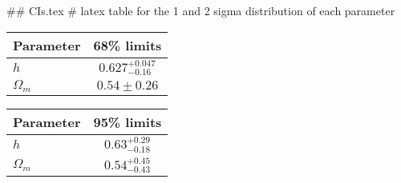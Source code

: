 ## CIs.tex
# latex table for the 1 and 2 sigma distribution of each parameter

\begin{tabular} { l  c}
 Parameter &  68\% limits\\
\hline
{\boldmath$h              $} & $0.627^{+0.047}_{-0.16}    $\\
{\boldmath$\Omega_m       $} & $0.54\pm 0.26              $\\
\hline
\end{tabular}

\begin{tabular} { l  c}
 Parameter &  95\% limits\\
\hline
{\boldmath$h              $} & $0.63^{+0.29}_{-0.18}      $\\
{\boldmath$\Omega_m       $} & $0.54^{+0.45}_{-0.43}      $\\
\hline
\end{tabular}
